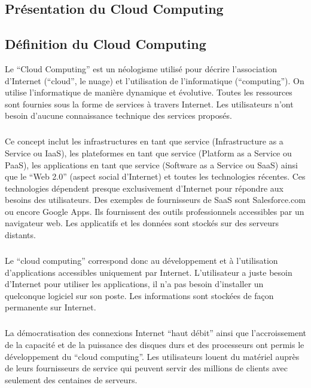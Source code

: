 \documentclass[a4paper,12pt]{report}
\begin{document}
\begin{onehalfspace}
	\chapter{Présentation du Cloud Computing}


	\section{Définition du Cloud Computing}
	
	Le “Cloud Computing” est un néologisme utilisé pour décrire l’association d’Internet (“cloud”, le nuage) et l’utilisation de l’informatique (“computing”). On utilise l’informatique de manière dynamique et évolutive. Toutes les ressources sont fournies sous la forme de services à travers Internet. Les utilisateurs n’ont besoin d’aucune connaissance technique des services proposés.

	\paragraph*{}
	Ce concept inclut les infrastructures en tant que service (Infrastructure as a Service ou IaaS), les plateformes en tant que service (Platform as a Service ou PaaS), les applications en tant que service (Software as a Service ou SaaS) ainsi que le “Web 2.0” (aspect social d’Internet) et toutes les technologies récentes. Ces technologies dépendent presque exclusivement d’Internet pour répondre aux besoins des utilisateurs. Des exemples de fournisseurs de SaaS sont Salesforce.com ou encore Google Apps. Ils fournissent des outils professionnels accessibles par un navigateur web. Les applicatifs et les données sont stockés sur des serveurs distants.
	
	\paragraph*{}
	Le “cloud computing” correspond donc au développement et à l’utilisation d’applications accessibles uniquement par Internet. L’utilisateur a juste besoin d’Internet pour utiliser les applications, il n’a pas besoin d’installer un quelconque logiciel sur son poste. Les informations sont stockées de façon permanente sur Internet.
	
	\paragraph*{}
	La démocratisation des connexions Internet “haut débit” ainsi que l'accroissement de la capacité et de la puissance des disques durs et des processeurs ont permis le développement du “cloud computing”. Les utilisateurs louent du matériel auprès de leurs fournisseurs de service qui peuvent servir des millions de clients avec seulement des centaines de serveurs.
	

\end{onehalfspace}
\end{document}
